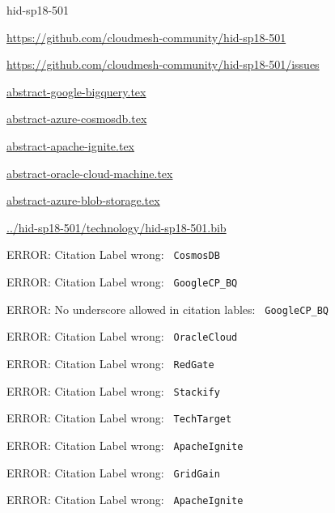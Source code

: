 \begin{IU}

hid-sp18-501

\url{https://github.com/cloudmesh-community/hid-sp18-501}

\url{https://github.com/cloudmesh-community/hid-sp18-501/issues}

\href{https://github.com/cloudmesh-community/hid-sp18-501/blob/master//technology/abstract-google-bigquery.tex}{abstract-google-bigquery.tex}

\href{https://github.com/cloudmesh-community/hid-sp18-501/blob/master//technology/abstract-azure-cosmosdb.tex}{abstract-azure-cosmosdb.tex}

\href{https://github.com/cloudmesh-community/hid-sp18-501/blob/master//technology/abstract-apache-ignite.tex}{abstract-apache-ignite.tex}

\href{https://github.com/cloudmesh-community/hid-sp18-501/blob/master//technology/abstract-oracle-cloud-machine.tex}{abstract-oracle-cloud-machine.tex}

\href{https://github.com/cloudmesh-community/hid-sp18-501/blob/master//technology/abstract-azure-blob-storage.tex}{abstract-azure-blob-storage.tex}

\href{https://github.com/cloudmesh-community/hid-sp18-501/blob/master//technology/hid-sp18-501.bib}{../hid-sp18-501/technology/hid-sp18-501.bib}

 ERROR: Citation Label wrong: \verb| CosmosDB |

 ERROR: Citation Label wrong: \verb| GoogleCP_BQ |

 ERROR: No underscore allowed in citation lables: \verb| GoogleCP_BQ |

 ERROR: Citation Label wrong: \verb| OracleCloud |

 ERROR: Citation Label wrong: \verb| RedGate |

 ERROR: Citation Label wrong: \verb| Stackify |

 ERROR: Citation Label wrong: \verb| TechTarget |

 ERROR: Citation Label wrong: \verb| ApacheIgnite |

 ERROR: Citation Label wrong: \verb| GridGain |

 ERROR: Citation Label wrong: \verb| ApacheIgnite |

\end{IU}


